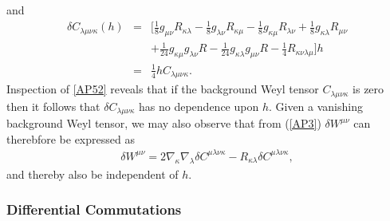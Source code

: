 %
and
%
\begin{eqnarray}
\delta C_{\lambda\mu\nu\kappa}(h)&=&\bigg[\tfrac{1}{8} g_{\mu \nu}  R_{\kappa \lambda} -  \tfrac{1}{8} g_{\lambda \nu} R_{\kappa \mu} -  \tfrac{1}{8} g_{\kappa \mu}  R_{\lambda \nu} +\tfrac{1}{8} g_{\kappa \lambda}  R_{\mu \nu}  
\nonumber\\
&&+ \tfrac{1}{24} g_{\kappa \mu} g_{\lambda \nu}  R -  \tfrac{1}{24} g_{\kappa \lambda} g_{\mu \nu}  R -  \tfrac{1}{4}  R_{\kappa \nu \lambda \mu}\bigg]h
\nonumber\\
&=&\frac{1}{4}hC_{\lambda\mu\nu\kappa}.
\label{AP52}
\end{eqnarray}
%
Inspection of \eqref{AP52} reveals that if the background Weyl tensor $C_{\lambda\mu\nu\kappa}$ is zero then it follows that $\delta C_{\lambda\mu\nu\kappa}$ has no dependence upon $h$. Given a vanishing background Weyl tensor, we may also observe that from (\ref{AP3}) $\delta W^{\mu\nu}$ can therebfore be expressed as
%
\begin{eqnarray}
\delta W^{\mu\nu}=2\nabla_{\kappa}\nabla_{\lambda}\delta C^{\mu\lambda\nu\kappa}-
R_{\kappa\lambda}\delta C^{\mu\lambda\nu\kappa},
\label{AP53}
\end{eqnarray}
%
and thereby also be independent of $h$. 

\subsubsection{Differential Commutations}
\label{sss:imposing_cgauge}

